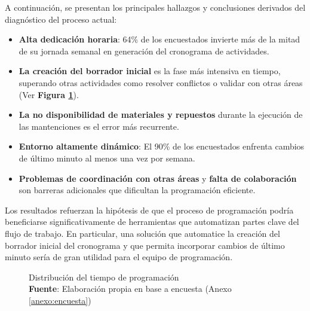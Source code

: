 \documentclass{article}
\begin{document}
A continuación, se presentan los principales hallazgos y conclusiones derivados del diagnóstico del proceso actual:

\begin{itemize}
    \item \textbf{Alta dedicación horaria}: 64\% de los encuestados invierte más de la mitad de su jornada semanal en generación del cronograma de actividades.
    \item \textbf{La creación del borrador inicial} es la fase más intensiva en tiempo, superando otras actividades como resolver conflictos o validar con otras áreas (Ver \textbf{Figura \ref{fig:pie_chart}}).
    \item \textbf{La no disponibilidad de materiales y repuestos} durante la ejecución de las mantenciones es el error más recurrente.
    \item \textbf{Entorno altamente dinámico}: El 90\% de los encuestados enfrenta cambios de último minuto al menos una vez por semana.
    \item \textbf{Problemas de coordinación con otras áreas} y \textbf{falta de colaboración} son barreras adicionales que dificultan la programación eficiente.
\end{itemize}

Los resultados refuerzan la hipótesis de que el proceso de programación podría beneficiarse significativamente de herramientas que automatizan partes clave del flujo de trabajo. En particular, una solución que automatice la creación del borrador inicial del cronograma y que permita incorporar cambios de último minuto sería de gran utilidad para el equipo de programación.


\begin{figure}[htbp]
    \centering
    \captionsetup{justification=centering} %
    \caption{Distribución del tiempo de programación \\ \textbf{Fuente}: Elaboración propia en base a encuesta (Anexo \ref{anexo:encuesta})}
    \label{fig:pie_chart}
  \end{figure}
\end{document}
